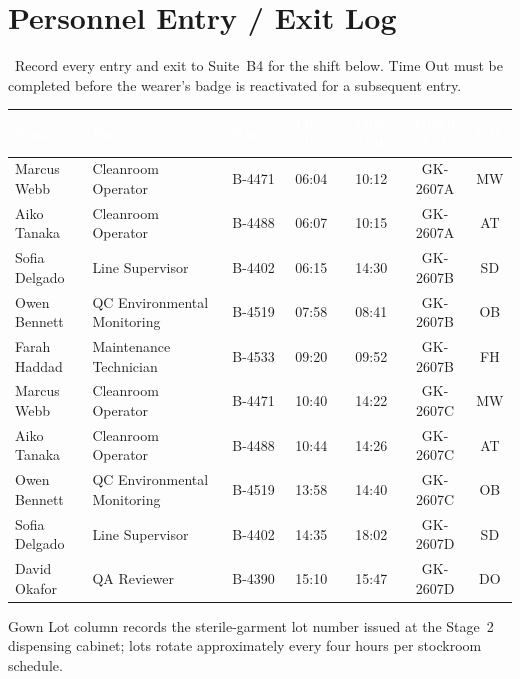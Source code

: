 \section*{Personnel Entry / Exit Log}

\faUser\ Record every entry and exit to Suite~B4 for the shift below. Time Out must be
completed before the wearer's badge is reactivated for a subsequent entry.

\begin{center}
\renewcommand{\arraystretch}{1.25}
\begin{tabularx}{\linewidth}{|Y|l|c|c|c|c|c|}
\hline
{}
\textcolor{white}{\bfseries Name} & \textcolor{white}{\bfseries Role} &
\textcolor{white}{\bfseries Badge} & \textcolor{white}{\bfseries Time In} &
\textcolor{white}{\bfseries Time Out} & \textcolor{white}{\bfseries Gown Lot} &
\textcolor{white}{\bfseries Init.} \\
\hline
Marcus Webb & Cleanroom Operator & B-4471 & 06:04 & 10:12 & GK-2607A & MW \\
\hline
{}
Aiko Tanaka & Cleanroom Operator & B-4488 & 06:07 & 10:15 & GK-2607A & AT \\
\hline
Sofia Delgado & Line Supervisor & B-4402 & 06:15 & 14:30 & GK-2607B & SD \\
\hline
{}
Owen Bennett & QC Environmental Monitoring & B-4519 & 07:58 & 08:41 & GK-2607B & OB \\
\hline
Farah Haddad & Maintenance Technician & B-4533 & 09:20 & 09:52 & GK-2607B & FH \\
\hline
{}
Marcus Webb & Cleanroom Operator & B-4471 & 10:40 & 14:22 & GK-2607C & MW \\
\hline
Aiko Tanaka & Cleanroom Operator & B-4488 & 10:44 & 14:26 & GK-2607C & AT \\
\hline
{}
Owen Bennett & QC Environmental Monitoring & B-4519 & 13:58 & 14:40 & GK-2607C & OB \\
\hline
Sofia Delgado & Line Supervisor & B-4402 & 14:35 & 18:02 & GK-2607D & SD \\
\hline
{}
David Okafor & QA Reviewer & B-4390 & 15:10 & 15:47 & GK-2607D & DO \\
\hline
\end{tabularx}
\end{center}

\vspace{2pt}
{\small\color{steelgray} Gown Lot column records the sterile-garment lot number issued at the
Stage~2 dispensing cabinet; lots rotate approximately every four hours per stockroom
schedule.}
